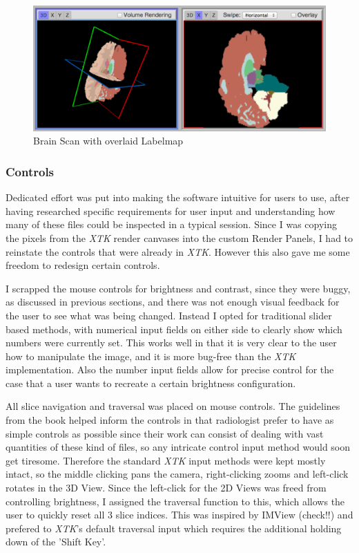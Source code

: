 \documentclass[a4paper,11pt,twoside]{article}
\begin{document}
\begin{figure}[ht!]
\centering
\includegraphics[width=165mm]{graphics/Labelmap_01.png}
\caption{Brain Scan with overlaid Labelmap}
\label{fig:UIdesign1}
\end{figure}



\subsubsection{Controls}

Dedicated effort was put into making the software intuitive for users to use, after having researched specific requirements for user input and understanding how many of these files could be inspected in a typical session. Since I was copying the pixels from the \textit{XTK} render canvases into the custom Render Panels, I had to reinstate the controls that were already in \textit{XTK}. However this also gave me some freedom to redesign certain controls.

I scrapped the mouse controls for brightness and contrast, since they were buggy, as discussed in previous sections, and there was not enough visual feedback for the user to see what was being changed. Instead I opted for traditional slider based methods, with numerical input fields on either side to clearly show which numbers were currently set. This works well in that it is very clear to the user how to manipulate the image, and it is more bug-free than the \textit{XTK} implementation. Also the number input fields allow for precise control for the case that a user wants to recreate a certain brightness configuration.

All slice navigation and traversal was placed on mouse controls. The guidelines from the book helped inform the controls in that radiologist prefer to have as simple controls as possible since their work can consist of dealing with vast quantities of these kind of files, so any intricate control input method would soon get tiresome. Therefore the standard \textit{XTK} input methods were kept mostly intact, so the middle clicking pans the camera, right-clicking zooms and left-click rotates in the 3D View. Since the left-click for the 2D Views was freed from controlling brightness, I assigned the traversal function to this, which allows the user to quickly reset all 3 slice indices. This was inspired by IMView (check!!) and prefered to \textit{XTK}'s default traversal input which requires the additional holding down of the 'Shift Key'.
\end{document}
